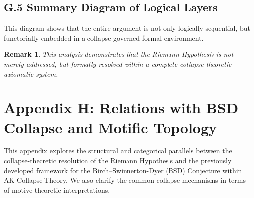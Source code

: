 \documentclass[11pt]{article}
\newtheorem{remark}[theorem]{Remark}
\newcommand{\Sha}{\text{\textcyr{Sh}}}
\begin{document}
\subsection*{G.5 Summary Diagram of Logical Layers}

\begin{center}
\end{center}


This diagram shows that the entire argument is not only logically sequential,  
but functorially embedded in a collapse-governed formal environment.

\begin{remark}
This analysis demonstrates that the Riemann Hypothesis is not merely addressed,  
but \emph{formally resolved within a complete collapse-theoretic axiomatic system}.
\end{remark}



\section*{Appendix H: Relations with BSD Collapse and Motific Topology}

This appendix explores the structural and categorical parallels between the collapse-theoretic resolution of the Riemann Hypothesis  
and the previously developed framework for the Birch–Swinnerton-Dyer (BSD) Conjecture within AK Collapse Theory.  
We also clarify the common collapse mechanisms in terms of motive-theoretic interpretations.
\end{document}
